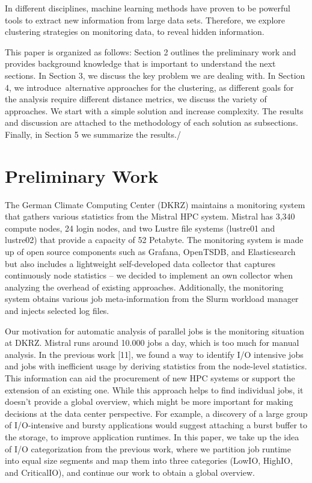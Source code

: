\documentclass[]{llncs}
\begin{document}
In different disciplines, machine learning methods have proven to be powerful tools to extract new information from large data sets.
Therefore, we explore clustering strategies on monitoring data, to reveal hidden information.

This paper is organized as follows: Section 2 outlines the preliminary work and provides background knowledge that is important to understand the next sections.
In Section 3, we discuss the key problem we are dealing with.
In Section 4, we introduce\ alternative approaches for the clustering, as different goals for the analysis require different distance metrics, we discuss the variety of approaches.
 We start with a simple solution and increase complexity.
The results and discussion are attached to the methodology of each solution as subsections.
Finally, in Section 5 we summarize the results./


\section{Preliminary Work}
The German Climate Computing Center (DKRZ) maintains a monitoring system that gathers various statistics from the Mistral HPC system.
Mistral has 3,340 compute nodes, 24 login nodes, and two Lustre file systems (lustre01 and lustre02) that provide a capacity of 52 Petabyte.
The monitoring system is made up of open source components such as Grafana, OpenTSDB, and Elasticsearch but also includes a lightweight self-developed data collector that captures continuously node statistics – we decided to implement an own collector when analyzing the overhead of existing approaches.
Additionally, the monitoring system obtains various job meta-information from the Slurm workload manager and injects selected log files.

Our motivation for automatic analysis of parallel jobs is the monitoring situation at DKRZ.
Mistral runs around 10.000 jobs a day, which is too much for manual analysis.
In the previous work [11], we found a way to identify I/O intensive jobs and jobs with inefficient usage by deriving statistics from the node-level statistics.
This information can aid the procurement of new HPC systems or support the extension of an existing one.
While this approach helps to find individual jobs, it doesn’t provide a global overview, which might be more important for making decisions at the data center perspective.
For example, a discovery of a large group of I/O-intensive and bursty applications would suggest attaching a burst buffer to the storage, to improve application runtimes.
In this paper, we take up the idea of I/O categorization from the previous work, where we partition job runtime into equal size segments and map them into three categories (LowIO, HighIO, and CriticalIO), and continue our work to obtain a global overview.
\end{document}
